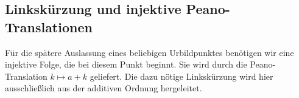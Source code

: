 \documentclass[main.tex]{subfiles}
\begin{document}
\begin{tabproofwide}
\end{tabproofwide}

\subsection{Linkskürzung und injektive Peano-Translationen}

Für die spätere Auslassung eines beliebigen Urbildpunktes benötigen wir eine
injektive Folge, die bei diesem Punkt beginnt.  Sie wird durch die
Peano-Translation $k\mapsto a+k$ geliefert.  Die dazu nötige Linkskürzung
wird hier ausschließlich aus der additiven Ordnung hergeleitet.
\end{document}
